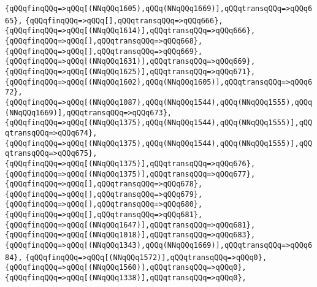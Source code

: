 \verb|{qQQqfinqQQq=>qQQq[(NNqQQq1605),qQQq(NNqQQq1669)],qQQqtransqQQq=>qQQq665},|\newline
\verb|{qQQqfinqQQq=>qQQq[],qQQqtransqQQq=>qQQq666},|\newline
\verb|{qQQqfinqQQq=>qQQq[(NNqQQq1614)],qQQqtransqQQq=>qQQq666},|\newline
\verb|{qQQqfinqQQq=>qQQq[],qQQqtransqQQq=>qQQq668},|\newline
\verb|{qQQqfinqQQq=>qQQq[],qQQqtransqQQq=>qQQq669},|\newline
\verb|{qQQqfinqQQq=>qQQq[(NNqQQq1631)],qQQqtransqQQq=>qQQq669},|\newline
\verb|{qQQqfinqQQq=>qQQq[(NNqQQq1625)],qQQqtransqQQq=>qQQq671},|\newline
\verb|{qQQqfinqQQq=>qQQq[(NNqQQq1602),qQQq(NNqQQq1605)],qQQqtransqQQq=>qQQq672},|\newline
\verb|{qQQqfinqQQq=>qQQq[(NNqQQq1087),qQQq(NNqQQq1544),qQQq(NNqQQq1555),qQQq(NNqQQq1669)],qQQqtransqQQq=>qQQq673},|\newline
\verb|{qQQqfinqQQq=>qQQq[(NNqQQq1375),qQQq(NNqQQq1544),qQQq(NNqQQq1555)],qQQqtransqQQq=>qQQq674},|\newline
\verb|{qQQqfinqQQq=>qQQq[(NNqQQq1375),qQQq(NNqQQq1544),qQQq(NNqQQq1555)],qQQqtransqQQq=>qQQq675},|\newline
\verb|{qQQqfinqQQq=>qQQq[(NNqQQq1375)],qQQqtransqQQq=>qQQq676},|\newline
\verb|{qQQqfinqQQq=>qQQq[(NNqQQq1375)],qQQqtransqQQq=>qQQq677},|\newline
\verb|{qQQqfinqQQq=>qQQq[],qQQqtransqQQq=>qQQq678},|\newline
\verb|{qQQqfinqQQq=>qQQq[],qQQqtransqQQq=>qQQq679},|\newline
\verb|{qQQqfinqQQq=>qQQq[],qQQqtransqQQq=>qQQq680},|\newline
\verb|{qQQqfinqQQq=>qQQq[],qQQqtransqQQq=>qQQq681},|\newline
\verb|{qQQqfinqQQq=>qQQq[(NNqQQq1647)],qQQqtransqQQq=>qQQq681},|\newline
\verb|{qQQqfinqQQq=>qQQq[(NNqQQq1018)],qQQqtransqQQq=>qQQq683},|\newline
\verb|{qQQqfinqQQq=>qQQq[(NNqQQq1343),qQQq(NNqQQq1669)],qQQqtransqQQq=>qQQq684},|\newline
\verb|{qQQqfinqQQq=>qQQq[(NNqQQq1572)],qQQqtransqQQq=>qQQq0},|\newline
\verb|{qQQqfinqQQq=>qQQq[(NNqQQq1560)],qQQqtransqQQq=>qQQq0},|\newline
\verb|{qQQqfinqQQq=>qQQq[(NNqQQq1338)],qQQqtransqQQq=>qQQq0},|\newline
